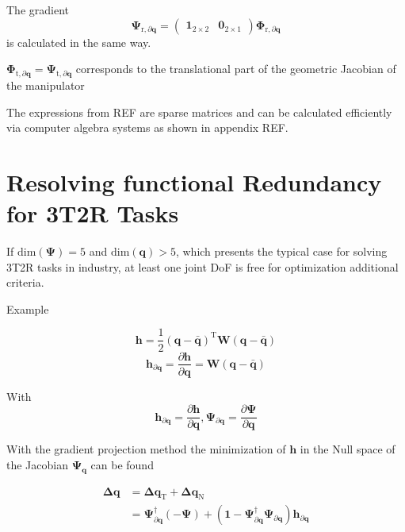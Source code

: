 \documentclass[twocolumn,10pt]{IFTOMM}
\newcommand{\bm}[1]{\boldsymbol{#1}}
\newcommand{\transp}[0]{{\mathrm{T}}}
\begin{document}
The gradient
\begin{equation}
\bm{\Psi}_{\mathrm{r},\partial\bm{q}}
=
\begin{pmatrix} \bm{1}_{2 \times 2} & \bm{0}_{2 \times 1}\end{pmatrix} \bm{\Phi}_{\mathrm{r},\partial\bm{q}}
\end{equation}
is calculated in the same way.

$\bm{\Phi}_{\mathrm{t},\partial\bm{q}}=\bm{\Psi}_{\mathrm{t},\partial\bm{q}}$ corresponds to the translational part of the geometric Jacobian of the manipulator

The expressions from REF are sparse matrices and can be calculated efficiently via computer algebra systems as shown in appendix REF.


\section{Resolving functional Redundancy for 3T2R Tasks}
\label{sec:ResFuncRed}


If $\mathrm{dim}(\bm{\Psi})=5$ and $\mathrm{dim}(\bm{q})>5$, which presents the typical case for solving 3T2R tasks in industry, at least one joint DoF is free for optimization additional criteria.

Example

\begin{equation}
\bm{h}
=
\frac{1}{2} (\bm{q}-\bar{\bm{q}})^\transp\bm{W}(\bm{q}-\bar{\bm{q}})
\end{equation}  
%
\begin{equation}
\bm{h}_{\partial\bm{q}}
=
\frac{\partial \bm{h}}{\partial \bm{q}}
=
\bm{W}(\bm{q}-\bar{\bm{q}})
\end{equation}

With
\begin{equation}
\bm{h}_{\partial\bm{q}}=\frac{\partial \bm{h}}{\partial \bm{q}},
\bm{\Psi}_{\partial\bm{q}}=\frac{\partial \bm{\Psi}}{\partial \bm{q}}
\end{equation}


With the gradient projection method the minimization of $\bm{h}$ in the Null space of the Jacobian $\bm{\Psi}_{\bm{q}}$ can be found

\begin{align}
\bm{\Delta}\bm{q}
&=
\bm{\Delta}\bm{q}_{\mathrm{T}} + \bm{\Delta}\bm{q}_{\mathrm{N}} \\
&=
\bm{\Psi}_{\partial\bm{q}}^{\dagger} (-\bm{\Psi}) + (\bm{1}-\bm{\Psi}_{\partial\bm{q}}^{\dagger}\bm{\Psi}_{\partial\bm{q}}) \bm{h}_{\partial\bm{q}}
\end{align}
\end{document}
